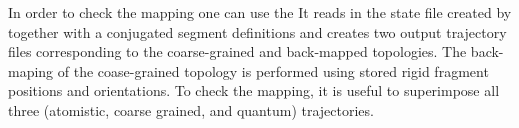 In order to check the mapping one can use the  \calculator
\label{sec:tdump}
\vskip 0.1cm
{\noindent \small \ctprun \csg \xmlcsg \exe {} }
\vskip 0.1cm
It reads in the state file created by \ctpmap together with a conjugated segment definitions and creates two output trajectory files corresponding to the coarse-grained and back-mapped topologies. The back-maping of the coase-grained topology is performed using stored rigid fragment positions and orientations. To check the mapping, it is useful to superimpose all three (atomistic, coarse grained, and quantum) trajectories.

